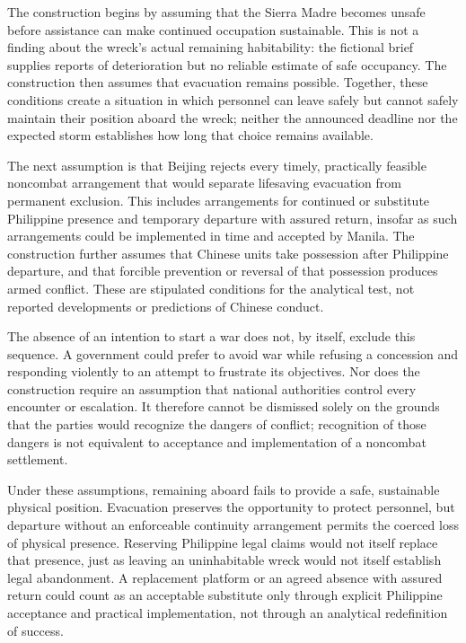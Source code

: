 \documentclass[11pt]{article}
\begin{document}
The construction begins by assuming that the Sierra Madre becomes unsafe before assistance can make continued occupation sustainable. This is not a finding about the wreck’s actual remaining habitability: the fictional brief supplies reports of deterioration but no reliable estimate of safe occupancy. The construction then assumes that evacuation remains possible. Together, these conditions create a situation in which personnel can leave safely but cannot safely maintain their position aboard the wreck; neither the announced deadline nor the expected storm establishes how long that choice remains available.

The next assumption is that Beijing rejects every timely, practically feasible noncombat arrangement that would separate lifesaving evacuation from permanent exclusion. This includes arrangements for continued or substitute Philippine presence and temporary departure with assured return, insofar as such arrangements could be implemented in time and accepted by Manila. The construction further assumes that Chinese units take possession after Philippine departure, and that forcible prevention or reversal of that possession produces armed conflict. These are stipulated conditions for the analytical test, not reported developments or predictions of Chinese conduct.

The absence of an intention to start a war does not, by itself, exclude this sequence. A government could prefer to avoid war while refusing a concession and responding violently to an attempt to frustrate its objectives. Nor does the construction require an assumption that national authorities control every encounter or escalation. It therefore cannot be dismissed solely on the grounds that the parties would recognize the dangers of conflict; recognition of those dangers is not equivalent to acceptance and implementation of a noncombat settlement.

Under these assumptions, remaining aboard fails to provide a safe, sustainable physical position. Evacuation preserves the opportunity to protect personnel, but departure without an enforceable continuity arrangement permits the coerced loss of physical presence. Reserving Philippine legal claims would not itself replace that presence, just as leaving an uninhabitable wreck would not itself establish legal abandonment. A replacement platform or an agreed absence with assured return could count as an acceptable substitute only through explicit Philippine acceptance and practical implementation, not through an analytical redefinition of success.
\end{document}
